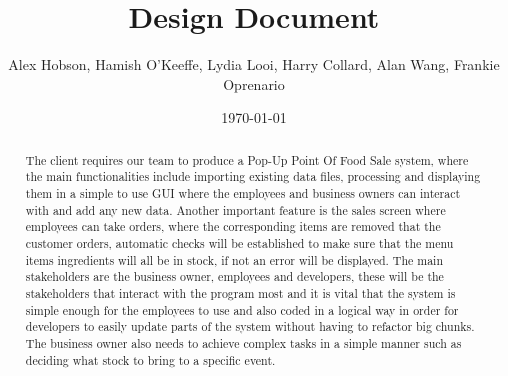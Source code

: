 \documentclass[a4paper,twoside,titlepage]{article}
\title{Design Document}
\author{Alex Hobson, Hamish O'Keeffe, Lydia Looi, Harry Collard, Alan Wang, Frankie Oprenario}
\date{\today}
\begin{document}
	\maketitle
	\tableofcontents
	
	\newpage
	\renewcommand{\abstractname}{Executive Summary}
	\begin{abstract}
		The client requires our team to produce a Pop-Up Point Of Food Sale system, where the main functionalities include importing existing data files, processing and displaying them in a simple to use GUI where the employees and business owners can interact with and add any new data. Another important feature is the sales screen where employees can take orders, where the corresponding items are removed that the customer orders, automatic checks will be established to make sure that the menu items ingredients will all be in stock, if not an error will be displayed. The main stakeholders are the business owner, employees and developers, these will be the stakeholders that interact with the program most and it is vital that the system is simple enough for the employees to use and also coded in a logical way in order for developers to easily update parts of the system without having to refactor big chunks. The business owner also needs to achieve complex tasks in a simple manner such as deciding what stock to bring to a specific event. 
	\end{abstract}
	
	
	
\end{document}
